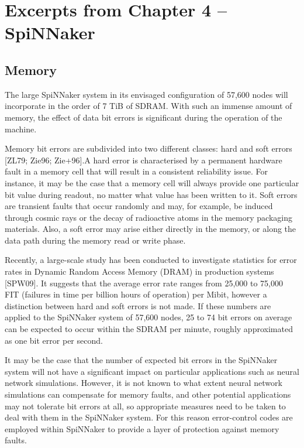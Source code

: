 \documentclass[oneside, a4paper, 11pt]{memoir}
\begin{document}
\newpage
\section{Excerpts from Chapter 4 -- SpiNNaker}
\subsection{Memory}
The large SpiNNaker system in its envisaged configuration of 57,600 nodes will incorporate in the order of 7 TiB of SDRAM. With such an immense amount of memory, the effect of data bit errors is significant during the operation of the machine.

Memory bit errors are subdivided into two different classes: hard and soft errors [ZL79; Zie96; Zie+96].A hard error is characterised by a permanent hardware fault in a memory cell that will result in a consistent reliability issue. For instance, it may be the case that a memory cell will always provide one particular bit value during readout, no matter what value has been written to it. Soft errors are transient faults that occur randomly and may, for example, be induced through cosmic rays or the decay of radioactive atoms in the memory packaging materials. Also, a soft error may arise either directly in the memory, or along the data path during the memory read or write phase.

Recently, a large-scale study has been conducted to investigate statistics for error rates in Dynamic Random Access Memory (DRAM) in production systems [SPW09]. It suggests that the average error rate ranges from 25,000 to 75,000 FIT (failures in time per billion hours of operation) per Mibit, however a distinction between hard and soft errors is not made. If these numbers are applied to the SpiNNaker system of 57,600 nodes, 25 to 74 bit errors on average can be expected to occur within the SDRAM per minute, roughly approximated as one bit error per second.

It may be the case that the number of expected bit errors in the SpiNNaker system will not have a significant impact on particular applications such as neural network simulations. However, it is not known to what extent neural network simulations can compensate for memory faults, and other potential applications may not tolerate bit errors at all, so appropriate measures need to be taken to deal with them in the SpiNNaker system. For this reason error-control codes are employed within SpiNNaker to provide a layer of protection against memory faults.
\end{document}
